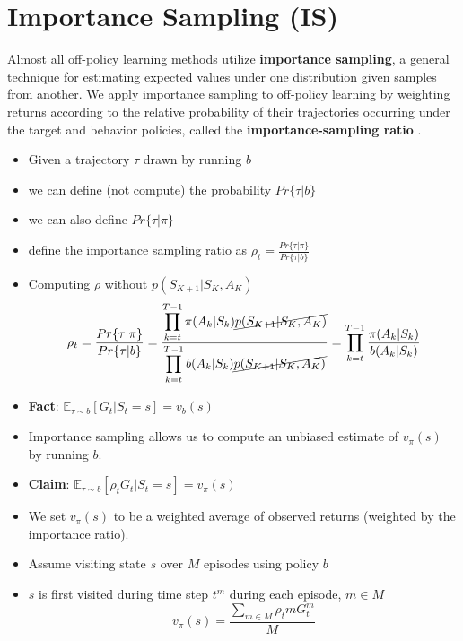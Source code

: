 \section{Importance Sampling (IS) \cite{medium/nerd-for-tech/monte-carlo-methods-for-reinforcement-learning-d30d874dd817,bits-pilani-slides}}\label{Importance Sampling}

Almost all off-policy learning methods utilize \textbf{importance sampling}, a general technique for estimating expected values under one distribution given samples from another. We apply importance sampling to off-policy learning by weighting returns according to the relative probability of their trajectories occurring under the target and behavior policies, called the \textbf{importance-sampling ratio}  \label{importance-sampling ratio}.

\begin{itemize}
    \item Given a trajectory $\tau$ drawn by running $b$
    \item we can define (not compute) the probability $Pr\{\tau|b\}$
    \item we can also define $Pr\{\tau|\pi\}$
    \item define the importance sampling ratio as $\rho_t = \displaystyle\frac{Pr\{\tau|\pi\}}{Pr\{\tau|b\}}$
    \item Computing $\rho$ without $p(S_{K+1}|S_K,A_K)$ 
    \[
        \rho_t = \displaystyle\frac{Pr\{\tau|\pi\}}{Pr\{\tau|b\}} = \displaystyle\frac{\displaystyle\prod_{k=t}^{T-1} \pi(A_k|S_k)\cancel{p(S_{K+1}|S_K,A_K)}}{\displaystyle\prod_{k=t}^{T-1} b(A_k|S_k)\cancel{p(S_{K+1}|S_K,A_K)}} = \displaystyle\prod_{k=t}^{T-1}\displaystyle\frac{\pi(A_k|S_k)}{b(A_k|S_k)}
    \]
    \item \textbf{Fact}: \( \mathbb{E}_{\tau \sim b}[G_t|S_t=s]=v_b(s) \)
    \item Importance sampling allows us to compute an unbiased estimate of $v_\pi(s)$ by running $b$.
    \item \textbf{Claim}: \( \mathbb{E}_{\tau \sim b}[\rho_t G_t|S_t=s]=v_\pi(s) \)
    \item We set $v_\pi(s)$ to be a weighted average of observed returns (weighted by the importance ratio).
    \item Assume visiting state $s$ over $M$ episodes using policy $b$
    \item $s$ is first visited during time step $t^m$ during each episode, $m\in M$
    \[
        v_\pi(s) = \displaystyle\frac{\displaystyle\sum_{m\in M} \rho_t m G_t^m}{M}
    \]
\end{itemize}


